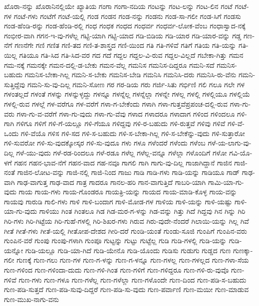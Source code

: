{ಖೊರಾ-ನನ್ನು
ಖೊರಾನಿನಲ್ಲಿಯೇ
ಖ್ಯಾತಿಯ
ಗಂಗಾ
ಗಂಗಾ-ನದಿಯ
ಗಂಟನ್ನು
ಗಂಟ-ಲನ್ನು
ಗಂಟ-ಲಿನ
ಗಂಟೆ
ಗಂಟೆ-ಗಳ
ಗಂಟೆ-ಗಳು
ಗಂಟೆಗೆ
ಗಂಟೆ-ಯಲ್ಲಿ
ಗಂಡ
ಗಂಡನ
ಗಂಡ-ನನ್ನು
ಗಂಡನು
ಗಂಡ-ಸಾ-ಗಲೀ
ಗಂಡ-ಸಿಗೆ
ಗಂಡಸು
ಗಂಡ-ಹೆಂಡಿ-ರನ್ನು
ಗಂಡ-ಹೆಂಡಿ-ರಲ್ಲಿ
ಗಂಧ
ಗಂಧಕ
ಗಂಧದ
ಗಂಧರ್ವ
ಗಂಧರ್ವ-ಲೋಕ-ವೆಂಬ
ಗಂಧಾಸ್ವಾದ-ನಕ್ಕೆ
ಗಂಭೀರ-ವಾಗಿ
ಗಗನ-ಇ-ವು-ಗಳೆಲ್ಲ
ಗಟ್ಟಿ-ಯಾಗಿ
ಗಟ್ಟಿ-ಯಾದ
ಗಡಿ-ಬಿಡಿಯ
ಗಡಿ-ಯಾರ
ಗಡಿ-ಯಾರ-ವನ್ನು
ಗಡ್ಡ
ಗಣ-ನೆಗೆ
ಗಣನೆಗೇ
ಗಣಿ
ಗಣಿತ
ಗಣಿ-ತದ
ಗಣಿ-ತ-ಶಾಸ್ತ್ರದ
ಗಣಿ-ಯಿಂದ
ಗತಿ
ಗತಿ-ಗಳಿವೆ
ಗತಿಗೆ
ಗತಿಯ
ಗತಿ-ಯನ್ನು
ಗತಿ-ಯಿಲ್ಲ
ಗತಿಯೂ
ಗತಿ-ಸಿದ
ಗತಿ-ಸಿದ-ವರ
ಗದ
ಗದೆ
ಗದ್ದಲ
ಗದ್ದಲ-ವಿ-ರುವ
ಗದ್ದಲ-ವಿಲ್ಲದೆ
ಗಬೇಕಾ-ಗಿತ್ತು
ಗಮನ
ಗಮ-ನಕ್ಕೆ
ಗಮನಕ್ಕೇ
ಗಮನ-ದಲ್ಲಿ-ಡ-ಬೇಕು
ಗಮನ-ವೆಲ್ಲ
ಗಮನಿಸ
ಗಮನಿಸ-ದಿದ್ದರೂ
ಗಮನಿ-ಸದೆ
ಗಮನಿಸ-ಬಹುದು
ಗಮನಿಸ-ಬೇಕಾ-ಗಿಲ್ಲ
ಗಮನಿ-ಸ-ಬೇಕು
ಗಮನಿಸ-ಬೇಡಿ
ಗಮನಿಸಿ
ಗಮನಿಸಿ-ದರು
ಗಮನಿಸಿ-ರು-ವೆನು
ಗಮನಿ-ಸುತ್ತಿದ್ದೆವು
ಗಮನಿ-ಸು-ವು-ದಿಲ್ಲ
ಗಮನಿ-ಸೋಣ
ಗರ
ಗರ-ಡಿಯ
ಗರು
ಗರ್ಜಿ-ಸಿತು
ಗರ್ಭಿಣಿ
ಗಲಿ
ಗಲೂ
ಗಲೇ
ಗಳ
ಗಳಂತಲ್ಲದೆ
ಗಳಂತೆ
ಗಳನ್ನು
ಗಳನ್ನುಳ್ಳದ್ದು
ಗಳನ್ನೂ
ಗಳನ್ನೆಲ್ಲ
ಗಳನ್ನೆಲ್ಲಾ
ಗಳನ್ನೇ
ಗಳಲ್ಲ
ಗಳಲ್ಲಿ
ಗಳಲ್ಲಿಯೂ
ಗಳಲ್ಲಿಯೆ
ಗಳಲ್ಲಿ-ರುವ
ಗಳಲ್ಲೆ
ಗಳ-ವರೆಗೂ
ಗಳ-ವರೆಗೆ
ಗಳಾ-ಗ-ಬೇಕೆಂದು
ಗಳಾಗಿ
ಗಳಾ-ಗುತ್ತವೆಪ್ರಪಂಚ-ದಲ್ಲಿ-ರುವ
ಗಳಾ-ಗು-ವರು
ಗಳಾ-ಗು-ವ-ವರೆಗೆ
ಗಳಾ-ಗು-ವುದು
ಗಳಾ-ಗು-ವೆವು
ಗಳಾದ
ಗಳಾದರೂ
ಗಳಾದಾಗ
ಗಳಿಂದ
ಗಳಿಂದಲೂ
ಗಳಿ-ಗಾಗಿ
ಗಳಿಗೂ
ಗಳಿಗೆ
ಗಳಿ-ಗೆ-ಯಲ್ಲೂ
ಗಳಿ-ಗೆಯೂ
ಗಳಿದ್ದವು
ಗಳಿ-ರ-ಬಹುದು
ಗಳಿ-ರುತ್ತವೆ
ಗಳಿವು
ಗಳಿವೆ
ಗಳಿ-ವೆ-ಒಂದು
ಗಳಿ-ವೆಯೊ
ಗಳಿಸ
ಗಳಿ-ಸದ
ಗಳಿ-ಸ-ಬಹುದು
ಗಳಿ-ಸ-ಬೇಕಾ-ಗಿಲ್ಲ
ಗಳಿ-ಸ-ಬೇಕೆನ್ನು-ವುದು
ಗಳಿ-ಸುತ್ತಾರೋ
ಗಳಿ-ಸುವರೋ
ಗಳಿ-ಸು-ವುದಕ್ಕೋಸ್ಕರ
ಗಳಿ-ಸು-ವುದೂ
ಗಳು
ಗಳೂ
ಗಳೆಂದರೆ
ಗಳೆಂದು
ಗಳೆಂಬ
ಗಳೆ-ಯ-ಲಾಗು-ವು-ದಿಲ್ಲ
ಗಳೆ-ಯು-ವುದು
ಗಳೆ-ರಡ-ರಿಂದಲೂ
ಗಳೆ-ರಡೂ
ಗಳೆಲ್ಲ
ಗಳೆಲ್ಲ-ವನ್ನೂ
ಗಳೆಲ್ಲಾ
ಗಳೊಂದಿಗೆ
ಗಳೋ
ಗವಿ-ಯೊ-ಳಗೆ
ಗಹನ
ಗಹನ-ಭಾವ-ನೆಗೆ
ಗಹನ-ವಾದ
ಗಹ-ನವೂ
ಗಾಗಲಿ
ಗಾಗಿ
ಗಾಗು-ವು-ದಿಲ್ಲ
ಗಾಜಾಗಿದ್ದಾನೆ
ಗಾಜಿನ
ಗಾಜಿ-ನಂತೆ
ಗಾಜಿನ-ಲೋಟ-ವನ್ನು
ಗಾಜಿ-ನಲ್ಲಿ
ಗಾಜಿ-ನಿಂದ
ಗಾಜು
ಗಾಡಿ
ಗಾಡಿ-ಗಳು
ಗಾಡಿ-ಯನ್ನು
ಗಾಡಿಯೂ
ಗಾಡ್
ಗಾಢ-ವಾಗಿ
ಗಾಢ-ವಾಗುತ್ತ
ಗಾಢ-ವಾದ
ಗಾತ್ರ
ಗಾದರೂ
ಗಾನಲ-ಹರಿ
ಗಾನ-ವಾಗುತ್ತಿದೆ
ಗಾಬರಿ-ಯಾಗಿ
ಗಾಮಿ-ಯಾ-ಗು-ವುದು
ಗಾಯ
ಗಾಯ-ಗಳು
ಗಾಯ-ಗೊಂಡರೂ
ಗಾಯತ್ರಿ-ಯನ್ನು
ಗಾಯದ
ಗಾಯ-ಮಾಡಿ-ಕೊಳ್ಳ
ಗಾಯ-ವನ್ನು
ಗಾಯವು
ಗಾರುಡಿ
ಗಾಲಿ-ಗಳು
ಗಾಳಿ
ಗಾಳಿ-ಬಂದಾಗ
ಗಾಳಿ-ಮೋಡ-ಗಳ
ಗಾಳಿಯ
ಗಾಳಿ-ಯನ್ನು
ಗಾಳಿ-ಯಷ್ಟು
ಗಾಳಿ-ಯಾ-ಗು-ವುದು
ಗಾಳಿಯು
ಗಿಂತ
ಗಿಂತಲೂ
ಗಿಡ
ಗಿಡ-ಮರ-ಗ-ಳನ್ನು
ಗಿಡ-ವನ್ನು
ಗಿತ್ತು
ಗಿದೆ
ಗಿದ್ದವು
ಗಿನ
ಗಿನ್ನು
ಗಿರಿ
ಗಿರಿ-ಗಳು
ಗಿರಿ-ಗಿಟ್ಟೆಯ
ಗಿರಿ-ಗುಹೆ-ಗಳಲ್ಲಿ
ಗಿರಿ-ಶಿಖರ-ಗಳು
ಗಿರುವ
ಗಿರು-ವುದೇ-ನೆಂದರೆ
ಗಿಲಾಯಿ-ಯನ್ನು
ಗಿಲ್ಲ
ಗಿವೆ
ಗೀತೆ
ಗೀತೆ-ಗಳು
ಗೀತೆ-ಯಲ್ಲಿ
ಗೀತೋಪ-ದೇಶದ
ಗೀರಿ-ದರೆ
ಗುಂಡಿ-ಯಂತೆ
ಗುಂಡು-ಸೂಜಿ
ಗುಂಪಿಗೆ
ಗುಂಪಿನ-ವರು
ಗುಂಪಿನ-ವರೆ
ಗುಂಪು
ಗುಂಪು-ಗಳಾಗಿ
ಗುಂಪೂ
ಗುಟ್ಟನ್ನು
ಗುಟ್ಟು
ಗುಟ್ಟೆಲ್ಲ
ಗುಡಿ
ಗುಡಿ-ಗಳಲ್ಲಿ
ಗುಡಿ-ಯನ್ನು
ಗುಡಿ-ಯನ್ನೋ
ಗುಡಿ-ಯಲ್ಲೂ
ಗುಡಿ-ಯಾ-ಗಿದೆ
ಗುಡಿ-ಯೇನೊ
ಗುಡಿ-ಯೊಂದು
ಗುಡಿಸು
ಗುಡುಗು
ಗುಡ್ಡದ
ಗುಣ
ಗುಣಕ್ಕಾ-ಗಲೀ
ಗುಣಕ್ಕೆ
ಗುಣ-ಗಲು
ಗುಣ-ಗಳ
ಗುಣ-ಗ-ಳನ್ನು
ಗುಣ-ಗ-ಳನ್ನೂ
ಗುಣ-ಗಳಲ್ಲ
ಗುಣ-ಗಳಲ್ಲದ
ಗುಣ-ಗಳಾ-ಸೆಯ
ಗುಣ-ಗಳಿಂದ
ಗುಣ-ಗಳಿಂದಾ-ದುದು
ಗುಣ-ಗಳಿ-ಗಿಂತ
ಗುಣ-ಗಳಿಗೆ
ಗುಣ-ಗಳಿದ್ದರೂ
ಗುಣ-ಗಳಿ-ರು-ವುವೊ
ಗುಣ-ಗಳಿವೆ
ಗುಣ-ಗಳು
ಗುಣ-ಗಳೂ
ಗುಣ-ಗಳೆಲ್ಲ
ಗುಣ-ಗಳೆಲ್ಲಾ
ಗುಣ-ಗಳೊಂದೇ
ಗುಣ-ದಿಂದ
ಗುಣ-ಪಡಿ-ಸ-ಬಹುದು
ಗುಣ-ಪಡಿ-ಸುತ್ತದೆ
ಗುಣ-ಪಡಿ-ಸುವು-ದಿದ್ದರೆ
ಗುಣ-ಪಡಿ-ಸು-ವುದು
ಗುಣ-ಪರ್ವಾಣಿ
ಗುಣ-ಮಯೀ
ಗುಣ-ಮಾಡುವ
ಗುಣ-ಮುಖ-ನಾಗು-ವನು
}

